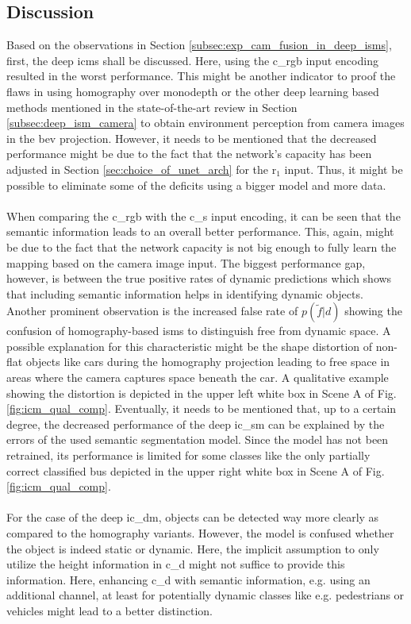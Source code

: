 \subsection{Discussion}
\label{subsec:discussion_deep_icm_ilm}
Based on the observations in Section \ref{subsec:exp_cam_fusion_in_deep_isms}, first, the deep \gls{icm}s shall be discussed. Here, using the \gls{c_rgb} input encoding resulted in the worst performance. This might be another indicator to proof the flaws in using homography over \gls{monodepth} or the other deep learning based methods mentioned in the state-of-the-art review in Section \ref{subsec:deep_ism_camera} to obtain environment perception from camera images in the \gls{bev} projection. However, it needs to be mentioned that the decreased performance might be due to the fact that the network's capacity has been adjusted in Section \ref{sec:choice_of_unet_arch} for the \gls{r}$_1$ input. Thus, it might be possible to eliminate some of the deficits using a bigger model and more data.
\\\\
When comparing the \gls{c_rgb} with the \gls{c_s} input encoding, it can be seen that the semantic information leads to an overall better performance. This, again, might be due to the fact that the network capacity is not big enough to fully learn the mapping based on the camera image input. The biggest performance gap, however, is between the true positive rates of dynamic predictions which shows that including semantic information helps in identifying dynamic objects. Another prominent observation is the increased false rate of $p(\tilde{f}|d)$ showing the confusion of homography-based \gls{ism}s to distinguish free from dynamic space. A possible explanation for this characteristic might be the shape distortion of non-flat objects like cars during the homography projection leading to free space in areas where the camera captures space beneath the car. A qualitative example showing the distortion is depicted in the upper left white box in Scene A of Fig. \ref{fig:icm_qual_comp}. Eventually, it needs to be mentioned that, up to a certain degree, the decreased performance of the deep \gls{ic_sm} can be explained by the errors of the used semantic segmentation model. Since the model has not been retrained, its performance is limited for some classes like the only partially correct classified bus depicted in the upper right white box in Scene A of Fig. \ref{fig:icm_qual_comp}.
\\\\
For the case of the deep \gls{ic_dm}, objects can be detected way more clearly as compared to the homography variants. However, the model is confused whether the object is indeed static or dynamic. Here, the implicit assumption to only utilize the height information in \gls{c_d} might not suffice to provide this information. Here, enhancing \gls{c_d} with semantic information, e.g. using an additional channel, at least for potentially dynamic classes like e.g. pedestrians or vehicles might lead to a better distinction.

